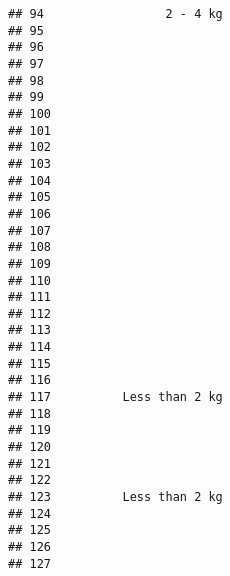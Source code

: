 \documentclass[
]{article}
\begin{document}
\begin{verbatim}
## 94                 2 - 4 kg                                               
## 95                                                                        
## 96                                                                        
## 97                                                                        
## 98                                                                        
## 99                                                                        
## 100                                                                       
## 101                                                                       
## 102                                                                       
## 103                                                                       
## 104                                                                       
## 105                                                                       
## 106                                                                       
## 107                                                                       
## 108                                                                       
## 109                                                                       
## 110                                                                       
## 111                                                                       
## 112                                                                       
## 113                                                                       
## 114                                                                       
## 115                                                                       
## 116                                                                       
## 117          Less than 2 kg                                               
## 118                                                                       
## 119                                                                       
## 120                                                                       
## 121                                                                       
## 122                                                                       
## 123          Less than 2 kg                                               
## 124                                                                       
## 125                                                                       
## 126                                                                       
## 127                                                                       

\end{verbatim}
\end{document}
